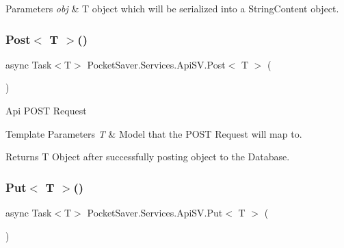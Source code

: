 \begin{DoxyParams}{Parameters}
{\em obj} & T object which will be serialized into a String\+Content object.\\
\hline
\end{DoxyParams}
\mbox{\label{class_pocket_saver_1_1_services_1_1_api_s_v_a4db27f4d8526c13b6227e36f40e609e3}} 
\subsubsection{\texorpdfstring{Post$<$ T $>$()}{Post< T >()}}
{\footnotesize\ttfamily async Task$<$T$>$ Pocket\+Saver.\+Services.\+Api\+S\+V.\+Post$<$ T $>$ (\begin{DoxyParamCaption}{ }\end{DoxyParamCaption})\hspace{0.3cm}{\ttfamily [inline]}}



Api P\+O\+ST Request 


\begin{DoxyTemplParams}{Template Parameters}
{\em T} & Model that the P\+O\+ST Request will map to.\\
\hline
\end{DoxyTemplParams}
\begin{DoxyReturn}{Returns}
T Object after successfully posting object to the Database.
\end{DoxyReturn}
\mbox{\label{class_pocket_saver_1_1_services_1_1_api_s_v_addfb96abb14d6189ad11040354540e08}} 
\subsubsection{\texorpdfstring{Put$<$ T $>$()}{Put< T >()}}
{\footnotesize\ttfamily async Task$<$T$>$ Pocket\+Saver.\+Services.\+Api\+S\+V.\+Put$<$ T $>$ (\begin{DoxyParamCaption}{ }\end{DoxyParamCaption})\hspace{0.3cm}{\ttfamily [inline]}}



